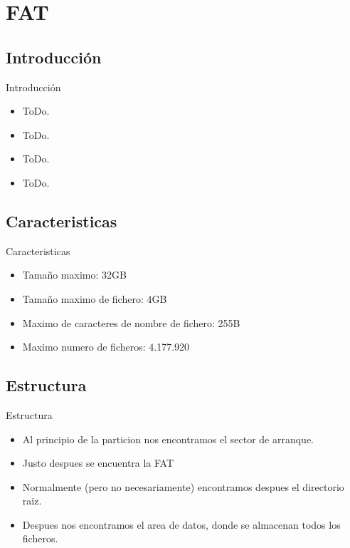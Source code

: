 \section{FAT}
\subsection{Introducción}
\begin{frame}{Introducción}
  \begin{itemize}
    \item ToDo.
    \item ToDo.
    \item ToDo.
    \item ToDo.
  \end{itemize}
\end{frame}

\subsection{Caracteristicas}
\begin{frame}{Caracteristicas}
  \begin{itemize}
    \item Tamaño maximo: 32GB
    \item Tamaño maximo de fichero: 4GB
    \item Maximo de caracteres de nombre de fichero: 255B
    \item Maximo numero de ficheros: 4.177.920
  \end{itemize}
\end{frame}

\subsection{Estructura}
\begin{frame}{Estructura}
  \begin{itemize}
    \item Al principio de la particion nos encontramos el sector de arranque.
    \item Justo despues se encuentra la FAT
    \item Normalmente (pero no necesariamente) encontramos despues el directorio raiz.
    \item Despues nos encontramos el area de datos, donde se almacenan todos los ficheros.
  \end{itemize}
\end{frame}

